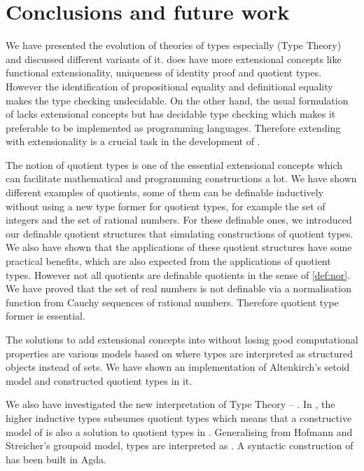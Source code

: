 \chapter{Conclusions and future work}


We have presented the evolution of theories of types especially \mltt (Type Theory) and discussed different variants of it. \ett does have more extensional concepts like functional extensionality, uniqueness of identity proof and quotient types. However the identification of propositional equality and definitional equality makes the type checking undecidable. On the other hand, the usual formulation of \itt lacks extensional concepts but has decidable type checking which makes it preferable to be implemented as programming languages. Therefore extending \itt with extensionality is a crucial task in the development of \mltt.

The notion of quotient types is one of the essential extensional concepts which can facilitate mathematical and programming constructions a lot. We have shown different examples of quotients, some of them can be definable inductively without using a new type former for quotient types, for example the set of integers and the set of rational numbers. For these definable ones, we introduced our definable quotient structures that simulating constructions of quotient types. We also have shown that the applications of these quotient structures have some practical benefits, which are also expected from 
the applications of quotient types.
However not all quotients are definable quotients in the sense of \autoref{def:nor}. We have proved that the set of real numbers is not definable via a normalisation function from Cauchy sequences of rational numbers. Therefore quotient type former is essential.

The solutions to add extensional concepts into \itt without losing good computational properties are various models based on \itt where types are interpreted as structured objects instead of sets. We have shown an implementation of Altenkirch's setoid model and constructed quotient types in it.

We also have investigated the new interpretation of Type Theory -- \hott. In \hott, the higher inductive types subsumes quotient types which means that a constructive model of \hott is also a solution to quotient types in \itt.
Generalising from Hofmann and Streicher's groupoid model, types are interpreted as \wog. A syntactic construction of \wog has been built in Agda. 


